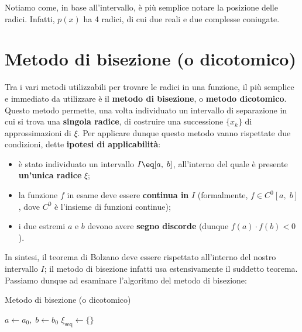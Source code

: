 Notiamo come, in base all'intervallo, è più semplice notare la posizione delle radici. Infatti, $p(x)$ ha 4 radici, di cui due reali e due complesse coniugate.

\section{Metodo di bisezione (o dicotomico)}

Tra i vari metodi utilizzabili per trovare le radici in una funzione, il più semplice e immediato da utilizzare è il \textbf{metodo di bisezione}, o \textbf{metodo dicotomico}. Questo metodo permette, una volta individuato un intervallo di separazione in cui si trova una \textbf{singola radice}, di costruire una successione $\{ x_k \}$ di approssimazioni di $\xi$. Per applicare dunque questo metodo vanno rispettate due condizioni, dette \textbf{ipotesi di applicabilità}:
\begin{itemize}
    \item è stato individuato un intervallo $I \eq [a, \; b]$, all'interno del quale è presente \textbf{un'unica radice} $\xi$;
    \item la funzione $f$ in esame deve essere \textbf{continua in} $I$ (formalmente, $f \in C^0 [a, \; b]$, dove $C^0$ è l'insieme di funzioni continue);
    \item i due estremi $a$ e $b$ devono avere \textbf{segno discorde} (dunque $f(a) \cdot f(b) < 0$).
\end{itemize}

In sintesi, il teorema di Bolzano deve essere rispettato all'interno del nostro intervallo $I$; il metodo di bisezione infatti usa estensivamente il suddetto teorema. Passiamo dunque ad esaminare l'algoritmo del metodo di bisezione:

\begin{algorithm}[H]
    \caption{Metodo di bisezione (o dicotomico)}
    $a \gets a_0, \; b \gets b_0$\;
    $\xi_{\text{seq}} \gets \{\}$ 
\end{algorithm}

